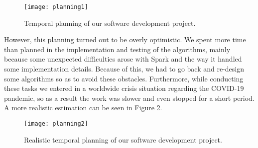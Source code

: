 \begin{figure}[h!]
\centering
\texttt{[image: planning1]}
\caption{Temporal planning of our software development project.}
\label{fig:plan1}
\end{figure}

However, this planning turned out to be overly optimistic. We spent more time than planned in the implementation and testing of the algorithms, mainly because some unexpected difficulties arose with Spark and the way it handled some implementation details. Because of this, we had to go back and re-design some algorithms so as to avoid these obstacles. Furthermore, while conducting these tasks we entered in a worldwide crisis situation regarding the COVID-19 pandemic, so as a result the work was slower and even stopped for a short period. A more realistic estimation can be seen in Figure \ref{fig:plan2}.
\vspace{1em}
\begin{figure}[h!]
\centering
\texttt{[image: planning2]}
\caption{Realistic temporal planning of our software development project.}
\label{fig:plan2}
\end{figure}
